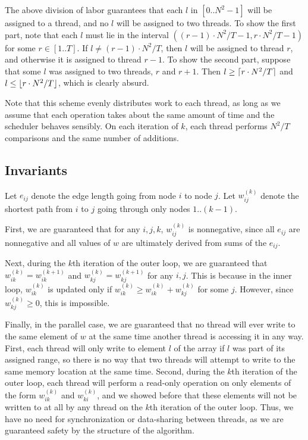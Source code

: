 \documentclass{article}
\DeclarePairedDelimiter\ceil{\lceil}{\rceil}
\DeclarePairedDelimiter\floor{\lfloor}{\rfloor}
\begin{document}
The above division of labor guarantees that each $l$ in $[0..N^2-1]$ will be assigned to a thread, and no $l$ will be assigned to two threads. To show the first part, note that each $l$ must lie in the interval $((r-1)\cdot N^2/T-1, r\cdot N^2/T-1)$ for some $r\in[1..T]$. If $l\neq (r-1)\cdot N^2/T$, then $l$ will be assigned to thread $r$, and otherwise it is assigned to thread $r-1$. To show the second part, suppose that some $l$ was assigned to two threads, $r$ and $r+1$. Then $l\geq\ceil{r\cdot N^2/T}$ and $l\leq\floor{r\cdot N^2/T}$, which is clearly absurd. 

Note that this scheme evenly distributes work to each thread, as long as we assume that each operation takes about the same amount of time and the scheduler behaves sensibly. On each iteration of $k$, each thread performs $N^2/T$ comparisons and the same number of additions. 
\subsection*{Invariants}
Let $e_{ij}$ denote the edge length going from node $i$ to node $j$. Let $w_{ij}^{(k)}$ denote the shortest path from $i$ to $j$ going through only nodes $1..(k-1)$. 

First, we are guaranteed that for any $i, j, k$, $w_{ij}^{(k)}$ is nonnegative, since all $e_{ij}$ are nonnegative and all values of $w$ are ultimately derived from sums of the $e_{ij}$.

Next, during the $k$th iteration of the outer loop, we are guaranteed that $w_{ik}^{(k)}=w_{ik}^{(k+1)}$ and $w_{kj}^{(k)}=w_{kj}^{(k+1)}$ for any $i,j$. This is because in the inner loop, $w_{ik}^{(k)}$ is updated only if $w_{ik}^{(k)}\ge w_{ik}^{(k)}+w_{kj}^{(k)}$ for some $j$. However, since $w_{kj}^{(k)}\geq0$, this is impossible.

Finally, in the parallel case, we are guaranteed that no thread will ever write to the same element of $w$ at the same time another thread is accessing it in any way. First, each thread will only write to element $l$ of the array if $l$ was part of its assigned range, so there is no way that two threads will attempt to write to the same memory location at the same time. 
Second, during the $k$th iteration of the outer loop, each thread will perform a read-only operation on only elements of the form $w_{ik}^{(k)}$ and $w_{ki}^{(k)}$, and we showed before that these elements will not be written to at all by any thread on the $k$th iteration of the outer loop. Thus, we have no need for synchronization or data-sharing between threads, as we are guaranteed safety by the structure of the algorithm.
\end{document}
